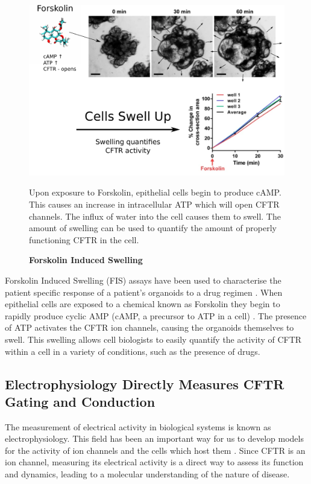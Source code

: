\begin{figure}
	\label{western_blot}
	\begin{center}
	\includegraphics[width=1\textwidth]{figures/FIS_demo.pdf}
	\end{center}
	\captionsetup{singlelinecheck = false, justification=raggedright}
	\caption[Forskolin Induced Swelling] {\textbf{Forskolin Induced Swelling}}{Upon exposure to Forskolin, epithelial cells begin to produce cAMP. This causes an increase in intracellular ATP which will open CFTR channels. The influx of water into the cell causes them to swell. The amount of swelling can be used to quantify the amount of properly functioning CFTR in the cell.} 
\end{figure}
Forskolin Induced Swelling (FIS) assays have been used to characterise the patient specific response of a patient's organoids to a drug regimen \cite{dekkers2013}. When epithelial cells are exposed to a chemical known as Forskolin they begin to rapidly produce cyclic AMP (cAMP, a precursor to ATP in a cell) \cite{bonora2012}. The presence of ATP activates the CFTR ion channels, causing the organoids themselves to swell. This swelling allows cell biologists to easily quantify the activity of CFTR within a cell in a variety of conditions, such as the presence of drugs.

\subsection{Electrophysiology Directly Measures CFTR Gating and Conduction}
The measurement of electrical activity in biological systems is known as electrophysiology. This field has been an important way for us to develop models for the activity of ion channels and the cells which host them \cite{aidley1996}. Since CFTR is an ion channel, measuring its electrical activity is a direct way to assess its function and dynamics, leading to a molecular understanding of the nature of disease. 

